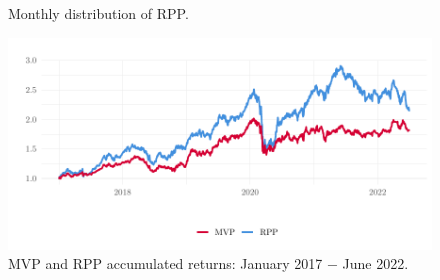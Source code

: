 \begin{figure}[H]
	\begin{subfigmatrix}{2}
	\end{subfigmatrix}
	\caption{Monthly distribution of RPP.}
	\label{fig:totalRiskPPP}
\end{figure}


\begin{figure}[H]
	\centering
	\includegraphics{figures/retornoRPPMVPVol.pdf}
	\caption{MVP and RPP accumulated returns: January 2017 $-$ June 2022.}
	\label{fig:retornoRPPMVP}
\end{figure}

